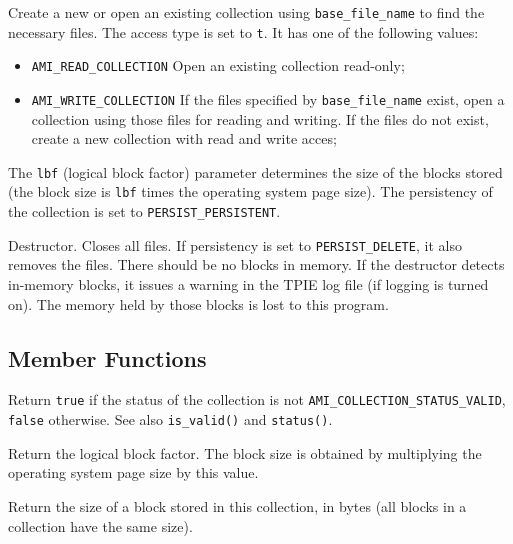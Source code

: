          {Create a new or open an 
        existing collection using \lstinline|base_file_name| to find the
        necessary files. The access type is set to \lstinline|t|. It has one of
        the following values:
        \begin{itemize} 
          \item[]\lstinline|AMI_READ_COLLECTION| Open an existing collection
          read-only;
          \item[]\lstinline|AMI_WRITE_COLLECTION| If the files specified by
          \lstinline|base_file_name| exist, open a collection using those files
          for reading and writing. If the files do not exist, create a new
          collection with read and write acces;
        \end{itemize}
        The \lstinline|lbf| (logical block factor) parameter determines the size
        of the blocks stored (the block size is \lstinline|lbf| times the
        operating system page size). The persistency of the collection is
        set to \lstinline|PERSIST_PERSISTENT|.}

       {Destructor.
      Closes all files. If persistency is set to \lstinline|PERSIST_DELETE|, it
      also removes the files. There should be no blocks in memory. If the
      destructor detects in-memory blocks, it issues a warning in the TPIE
      log file (if logging is turned on). The memory held by those blocks
      is lost to this program.}

   \etabb

\subsection{Member Functions}

   \btabb

         {Return \lstinline|true| if
        the status of the collection is not
        \lstinline|AMI_COLLECTION_STATUS_VALID|, \lstinline|false|
        otherwise. See also \lstinline|is_valid()| and \lstinline|status()|.}

         {Return the logical
        block factor. The block size is obtained by multiplying the
        operating system page size by this value.}

         {Return the size of a block
        stored in this collection, in bytes (all blocks in a collection
        have the same size).}


